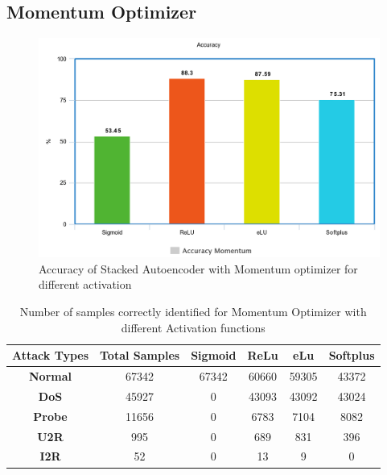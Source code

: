 \documentclass[12pt, a4paper]{report}
\begin{document}
\begin{appendices}

\section {Momentum Optimizer}
\begin{figure}[ht]
\centering
\captionsetup{justification=centering,margin=2cm}
\includegraphics[width=13cm]{accuracy_momentum_tflearn.png}
\caption{ Accuracy of Stacked Autoencoder with Momentum optimizer for different activation }
\label{fig:acc_Momentum}
\end{figure}
\clearpage
\begin{table}[h]
\centering
\captionsetup{justification=centering,margin=2cm}
\begin{tabular}{|c|c|c|c|c|c|}
\hline
\textbf{Attack Types} & \textbf{Total Samples} & \textbf{Sigmoid} & \textbf{ReLu} & \textbf{eLu} & \textbf{Softplus} \\ \hline
\textbf{Normal}       & 67342                  & 67342            & 60660         & 59305        & 43372             \\ \hline
\textbf{DoS}          & 45927                  & 0          		  & 43093         & 43092        & 43024             \\ \hline
\textbf{Probe}        & 11656                  & 0           		  & 6783          & 7104         & 8082              \\ \hline
\textbf{U2R}          & 995                    & 0              		& 689           & 831          & 396               \\ \hline
\textbf{I2R}          & 52                     & 0               		& 13            & 9           & 0                \\ \hline
\end{tabular}
\caption{Number of samples correctly identified for Momentum Optimizer with different Activation functions}
\label{confusion_Momentum}
\end{table}

\end{appendices}
\end{document}
